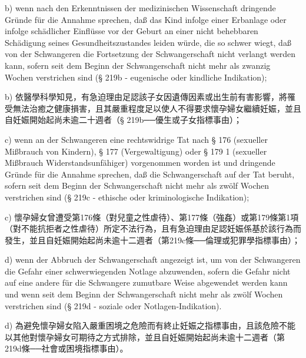 \documentclass[12pt]{article}
\begin{document}
\syncleft
\begin{sourcepara}
b) wenn nach den Erkenntnissen der medizinischen Wissenschaft dringende Gründe für die Annahme sprechen, daß das Kind infolge einer Erbanlage oder infolge schädlicher Einflüsse vor der Geburt an einer nicht behebbaren Schädigung seines Gesundheitszustandes leiden würde, die so schwer wiegt, daß von der Schwangeren die Fortsetzung der Schwangerschaft nicht verlangt werden kann, sofern seit dem Beginn der Schwangerschaft nicht mehr als zwanzig Wochen verstrichen sind (§ 219b - eugenische oder kindliche Indikation);
\end{sourcepara}
\begin{transpara}
b) 依醫學科學知見，有急迫理由足認該子女因遺傳因素或出生前有害影響，將罹受無法治癒之健康損害，且其嚴重程度足以使人不得要求懷孕婦女繼續妊娠，並且自妊娠開始起尚未逾二十週者（§ 219b──優生或子女指標事由）；
\end{transpara}

\syncleft
\begin{sourcepara}
c) wenn an der Schwangeren eine rechtswidrige Tat nach § 176 (sexueller Mißbrauch von Kindern), § 177 (Vergewaltigung) oder § 179 \abbrAbs{} 1 (sexueller Mißbrauch Widerstandsunfähiger) vorgenommen worden ist und dringende Gründe für die Annahme sprechen, daß die Schwangerschaft auf der Tat beruht, sofern seit dem Beginn der Schwangerschaft nicht mehr als zwölf Wochen verstrichen sind (§ 219c - ethische oder kriminologische Indikation);
\end{sourcepara}
\begin{transpara}
c) 懷孕婦女曾遭受第176條（對兒童之性虐待）、第177條（強姦）或第179條第1項（對不能抗拒者之性虐待）所定不法行為，且有急迫理由足認妊娠係基於該行為而發生，並且自妊娠開始起尚未逾十二週者（第219c條──倫理或犯罪學指標事由）；
\end{transpara}

\syncleft
\begin{sourcepara}
d) wenn der Abbruch der Schwangerschaft angezeigt ist, um von der Schwangeren die Gefahr einer schwerwiegenden Notlage abzuwenden, sofern die Gefahr nicht auf eine andere für die Schwangere zumutbare Weise abgewendet werden kann und wenn seit dem Beginn der Schwangerschaft nicht mehr als zwölf Wochen verstrichen sind (§ 219d - soziale oder Notlagen-Indikation).
\end{sourcepara}
\begin{transpara}
d) 為避免懷孕婦女陷入嚴重困境之危險而有終止妊娠之指標事由，且該危險不能以其他對懷孕婦女可期待之方式排除，並且自妊娠開始起尚未逾十二週者（第219d條──社會或困境指標事由）。
\end{transpara}
\end{document}
